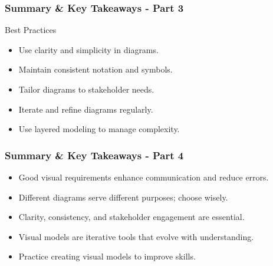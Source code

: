 \documentclass{beamer}
\begin{document}
\begin{frame}[fragile]
    \frametitle{Summary & Key Takeaways - Part 3}
    \begin{block}{Best Practices}
        \begin{itemize}
            \item Use clarity and simplicity in diagrams.
            \item Maintain consistent notation and symbols.
            \item Tailor diagrams to stakeholder needs.
            \item Iterate and refine diagrams regularly.
            \item Use layered modeling to manage complexity.
        \end{itemize}
    \end{block}
\end{frame}

\begin{frame}[fragile]
    \frametitle{Summary & Key Takeaways - Part 4}
    \begin{itemize}
        \item Good visual requirements enhance communication and reduce errors.
        \item Different diagrams serve different purposes; choose wisely.
        \item Clarity, consistency, and stakeholder engagement are essential.
        \item Visual models are iterative tools that evolve with understanding.
        \item Practice creating visual models to improve skills.
    \end{itemize}
\end{frame}
\end{document}
